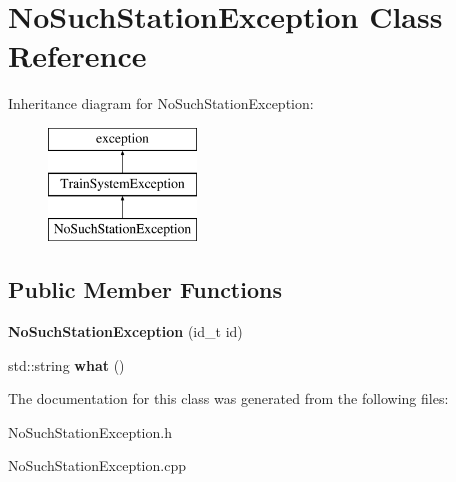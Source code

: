 \hypertarget{classNoSuchStationException}{}\section{No\+Such\+Station\+Exception Class Reference}
\label{classNoSuchStationException}
Inheritance diagram for No\+Such\+Station\+Exception\+:\begin{figure}[H]
\begin{center}
\leavevmode
\includegraphics[height=3.000000cm]{classNoSuchStationException}
\end{center}
\end{figure}
\subsection*{Public Member Functions}
\begin{DoxyCompactItemize}
\item 
\mbox{\label{classNoSuchStationException_a3e907e61f0836f6954f40bd63538bcb6}} 
{\bfseries No\+Such\+Station\+Exception} (id\+\_\+t id)
\item 
\mbox{\label{classNoSuchStationException_aef7808e1393d0ed22d130fa05d20d8f7}} 
std\+::string {\bfseries what} ()
\end{DoxyCompactItemize}


The documentation for this class was generated from the following files\+:\begin{DoxyCompactItemize}
\item 
No\+Such\+Station\+Exception.\+h\item 
No\+Such\+Station\+Exception.\+cpp\end{DoxyCompactItemize}
